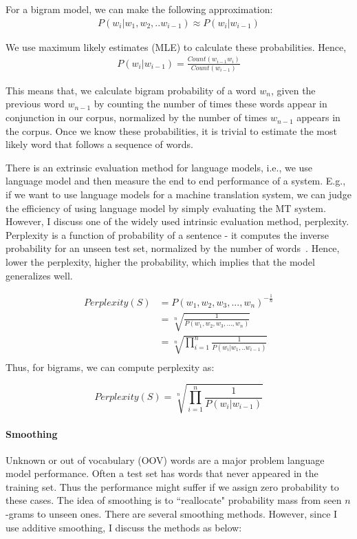 For a bigram model, we can make the following approximation:
\begin{align}
 P(w_i|w_1,w_2,..w_{i-1}) \approx P(w_i|w_{i-1})
\end{align}

We use maximum likely estimates (MLE) to calculate these probabilities. Hence,
\begin{align}
    P(w_i|w_{i-1}) = \frac{Count(w_{i-1}w_i)}{Count(w_{i-1})}
\end{align}

This means that, we calculate bigram probability of a word $w_n$, given the previous word $w_{n-1}$ by counting the number of times these words appear in conjunction in our corpus, normalized by the number of times $w_{n-1}$ appears in the corpus. 
Once we know these probabilities, it is trivial to estimate the most likely word that follows a sequence of words.  

There is an extrinsic evaluation method for language models, i.e., we use language model and then measure the end to end performance of a system. E.g., if we want to use language models for a machine translation system, we can judge the efficiency of using language model by simply evaluating the MT system. However, I discuss one of the widely used intrinsic evaluation method, perplexity. Perplexity is a function of probability of a sentence - it computes the inverse probability for an unseen test set, normalized by the number of words~\citep{jurafsky2014speech}. Hence, lower the perplexity, higher the probability, which implies that the model generalizes well.


\begin{equation}
    \begin{aligned}
    Perplexity(S) & = P(w_1,w_2,w_3, ... , w_n)^{-\frac{1}{n}} \\
    & = \sqrt[n]{\frac{1}{P(w_1,w_2,w_3, ... , w_n)}} \\
    & = \sqrt[n]{\prod_{i=1}^{n}\frac{1}{P(w_i|w_1, .. w_{i-1})}} \\
    \end{aligned}
\end{equation}
Thus, for bigrams, we can compute perplexity as:

\begin{equation}
    Perplexity(S) = \sqrt[n]{\prod_{i=1}^{n}\frac{1}{P(w_i|w_{i-1})}}
\end{equation}
    
    
\paragraph*{Smoothing}
Unknown or out of vocabulary (OOV) words are a major problem language model performance. Often a test set has words that never appeared in the training set. Thus the performance might suffer if we assign zero probability to these cases. The idea of smoothing is to ``reallocate" probability mass from seen $n$-grams to unseen ones. There are several smoothing methods. However, since I use additive smoothing, I discuss the methods as below:

